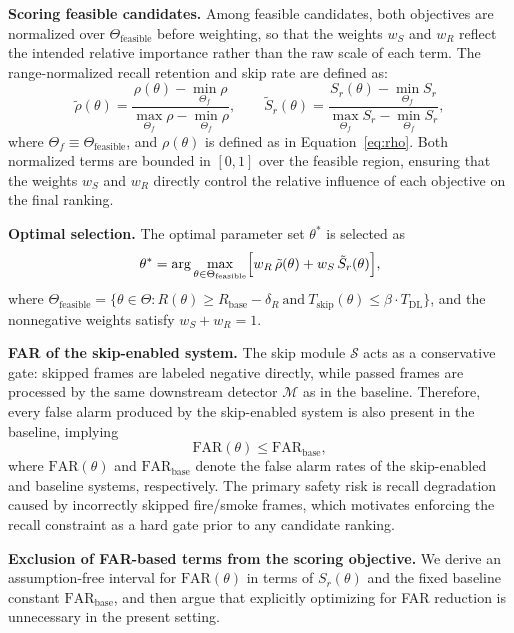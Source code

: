 \textbf{Scoring feasible candidates.}
Among feasible candidates, both objectives are normalized over
$\Theta_{\text{feasible}}$ before weighting, so that the weights
$w_S$ and $w_R$ reflect the intended relative importance rather
than the raw scale of each term.
The range-normalized recall retention and skip rate are defined as:
\begin{equation}
    \tilde{\rho}(\theta)
    = \frac{\rho(\theta) - \min_{\Theta_f}\rho}
           {\max_{\Theta_f}\rho - \min_{\Theta_f}\rho},
    \qquad
    \tilde{S}_r(\theta)
    = \frac{S_r(\theta) - \min_{\Theta_f}S_r}
           {\max_{\Theta_f}S_r  - \min_{\Theta_f}S_r},
\end{equation}
where $\Theta_f \equiv \Theta_{\text{feasible}}$,
and $\rho(\theta)$ is defined as in Equation~\eqref{eq:rho}.
Both normalized terms are bounded in $[0, 1]$ over the feasible
region, ensuring that the weights $w_S$ and $w_R$ directly control
the relative influence of each objective on the final ranking.

\textbf{Optimal selection.}
The optimal parameter set $\theta^*$ is selected as
\begin{equation}
    \theta^*
    = \arg\max_{\theta \in \Theta_{\text{feasible}}}
      \Bigl[
          w_R\,\tilde{\rho}(\theta)
          +
          w_S\,\tilde{S}_r(\theta)
      \Bigr],
\end{equation}
where $\Theta_{\text{feasible}} = \{\theta \in \Theta :
R(\theta) \geq R_{\text{base}} - \delta_R
\ \text{and}\ T_{\text{skip}}(\theta) \leq \beta \cdot T_{\text{DL}}\}$,
and the nonnegative weights satisfy $w_S + w_R = 1$.

\textbf{FAR of the skip-enabled system.} The skip module $\mathcal{S}$ acts as
a conservative gate: skipped frames are labeled negative directly, while passed
frames are processed by the same downstream detector $\mathcal{M}$ as in the
baseline. Therefore, every false alarm produced by the skip-enabled system is
also present in the baseline, implying
\begin{equation}
    \mathrm{FAR}(\theta) \leq \mathrm{FAR}_{\text{base}},
\end{equation}
where $\mathrm{FAR}(\theta)$ and $\mathrm{FAR}_{\text{base}}$ denote the false
alarm rates of the skip-enabled and baseline systems, respectively. The primary
safety risk is recall degradation caused by incorrectly skipped fire/smoke
frames, which motivates enforcing the recall constraint as a hard gate prior to
any candidate ranking.

\textbf{Exclusion of FAR-based terms from the scoring objective.}
We derive an assumption-free interval for $\mathrm{FAR}(\theta)$ in terms of
$S_r(\theta)$ and the fixed baseline constant
$\mathrm{FAR}_{\text{base}}$, and then argue that explicitly optimizing
for FAR reduction is unnecessary in the present setting.

